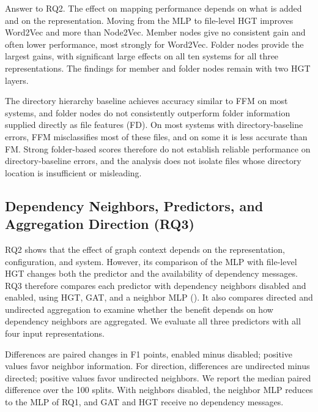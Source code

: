 \begin{GrayBox}{Answer to RQ2.}
The effect on mapping performance depends on what is added and on the representation. Moving from the MLP to file-level HGT improves Word2Vec and \ft{} more than Node2Vec. Member nodes give no consistent gain and often lower performance, most strongly for Word2Vec. Folder nodes provide the largest gains, with significant large effects on all ten systems for all three representations. The findings for member and folder nodes remain with two HGT layers.

The directory hierarchy baseline achieves accuracy similar to FFM on most systems, and folder nodes do not consistently outperform folder information supplied directly as file features (FD). On most systems with directory-baseline errors, FFM misclassifies most of these files, and on some it is less accurate than FM. Strong folder-based scores therefore do not establish reliable performance on directory-baseline errors, and the analysis does not isolate files whose directory location is insufficient or misleading.
\end{GrayBox}
\subsection{Dependency Neighbors, Predictors, and Aggregation Direction (RQ3)\label{sec:rq3}}

RQ2 shows that the effect of graph context depends on the representation, configuration, and system. However, its comparison of the MLP with file-level HGT changes both the predictor and the availability of dependency messages. RQ3 therefore compares each predictor with dependency neighbors disabled and enabled, using HGT, GAT, and a neighbor MLP (\mlp{}). It also compares directed and undirected aggregation to examine whether the benefit depends on how dependency neighbors are aggregated. We evaluate all three predictors with all four input representations.

Differences are paired changes in F1 points, enabled minus disabled; positive values favor neighbor information. For direction, differences are undirected minus directed; positive values favor undirected neighbors. We report the median paired difference over the 100 splits. With neighbors disabled, the neighbor MLP reduces to the MLP of RQ1, and GAT and HGT receive no dependency messages.


